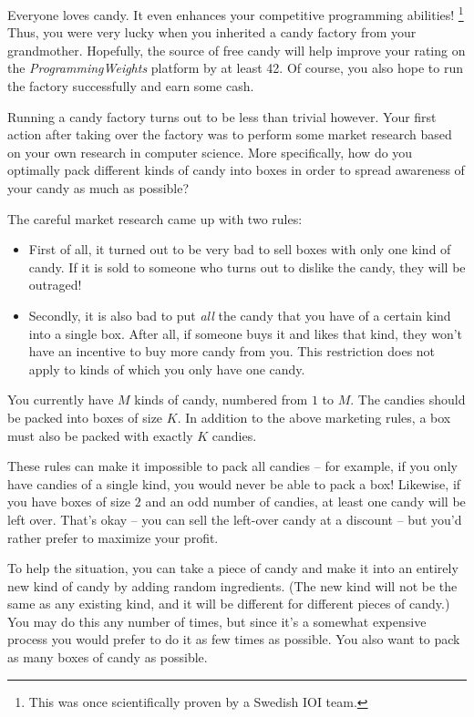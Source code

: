Everyone loves candy.
It even enhances your competitive programming abilities!
\footnote{This was once scientifically proven by a Swedish IOI team.}
Thus, you were very lucky when you inherited a candy factory from your grandmother.
Hopefully, the source of free candy will help improve your rating on the \emph{ProgrammingWeights} platform by at least 42.
Of course, you also hope to run the factory successfully and earn some cash.

Running a candy factory turns out to be less than trivial however.
Your first action after taking over the factory was to perform some market research based on your own research in computer science.
More specifically, how do you optimally pack different kinds of candy into boxes in order to spread awareness of your candy as much as possible?

The careful market research came up with two rules:
\begin{itemize}
  \item First of all, it turned out to be very bad to sell boxes with only one kind of candy.
    If it is sold to someone who turns out to dislike the candy, they will be outraged!
  \item Secondly, it is also bad to put \emph{all} the candy that you have of a certain kind into a single box.
    After all, if someone buys it and likes that kind, they won't have an incentive to buy more candy from you.
    This restriction does not apply to kinds of which you only have one candy.
\end{itemize}

You currently have $M$ kinds of candy, numbered from $1$ to $M$.
The candies should be packed into boxes of size $K$.
In addition to the above marketing rules, a box must also be packed with exactly $K$ candies.

These rules can make it impossible to pack all candies -- for example, if you only have candies of a single kind, you would never be able to pack a box!
Likewise, if you have boxes of size $2$ and an odd number of candies, at least one candy will be left over.
That's okay -- you can sell the left-over candy at a discount -- but you'd rather prefer to maximize your profit.

To help the situation, you can take a piece of candy and make it into an entirely new kind of candy by adding random ingredients.
(The new kind will not be the same as any existing kind, and it will be different for different pieces of candy.)
You may do this any number of times, but since it's a somewhat expensive process you would prefer to do it as few times as possible.
You also want to pack as many boxes of candy as possible.

